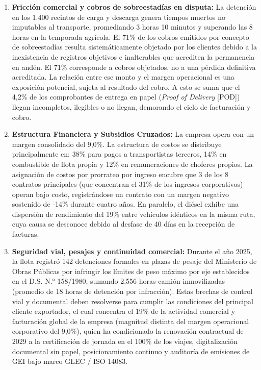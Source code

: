 \begin{enumerate}
  \item \textbf{Fricción comercial y cobros de sobreestadías en disputa:} La detención en los 1.400 recintos de carga y descarga genera tiempos muertos no imputables al transporte, promediando 3 horas 10 minutos y superando las 8 horas en la temporada agrícola. El 71\% de los cobros emitidos por concepto de sobreestadías resulta sistemáticamente objetado por los clientes debido a la inexistencia de registros objetivos e inalterables que acrediten la permanencia en andén. El 71\% corresponde a cobros objetados, no a una pérdida definitiva acreditada. La relación entre ese monto y el margen operacional es una exposición potencial, sujeta al resultado del cobro. A esto se suma que el 4,2\% de los comprobantes de entrega en papel (\textit{Proof of Delivery} [POD]) llegan incompletos, ilegibles o no llegan, demorando el ciclo de facturación y cobro.
  \item \textbf{Estructura Financiera y Subsidios Cruzados:} La empresa opera con un margen consolidado del 9,0\%. La estructura de costos se distribuye principalmente en: 38\% para pagos a transportistas terceros, 14\% en combustible de flota propia y 12\% en remuneraciones de choferes propios. La asignación de costos por prorrateo por ingreso encubre que 3 de los 8 contratos principales (que concentran el 31\% de los ingresos corporativos) operan bajo costo, registrándose un contrato con un margen negativo sostenido de -14\% durante cuatro años. En paralelo, el diésel exhibe una dispersión de rendimiento del 19\% entre vehículos idénticos en la misma ruta, cuya causa se desconoce debido al desfase de 40 días en la recepción de facturas.
  \item \textbf{Seguridad vial, pesajes y continuidad comercial:} Durante el año 2025, la flota registró 142 detenciones formales en plazas de pesaje del Ministerio de Obras Públicas por infringir los límites de peso máximo por eje establecidos en el D.S. N.° 158/1980, sumando 2.556 horas-camión inmovilizadas (promedio de 18 horas de detención por infracción). Estas brechas de control vial y documental deben resolverse para cumplir las condiciones del principal cliente exportador, el cual concentra el 19\% de la actividad comercial y facturación global de la empresa (magnitud distinta del margen operacional corporativo del 9,0\%), quien ha condicionado la renovación contractual de 2029 a la certificación de jornada en el 100\% de los viajes, digitalización documental sin papel, posicionamiento continuo y auditoría de emisiones de GEI bajo marco GLEC / ISO 14083.
\end{enumerate}

